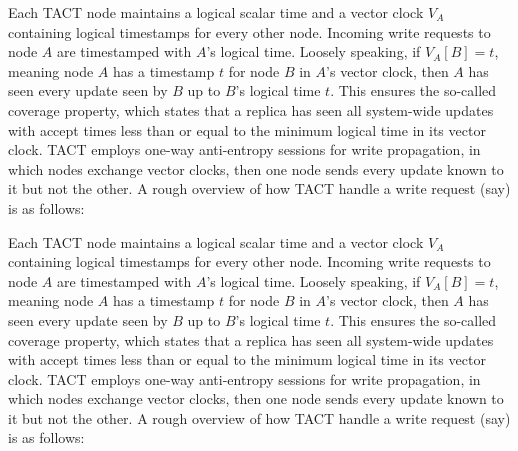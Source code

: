 Each TACT node maintains a logical scalar time and a vector clock $V_A$
containing logical timestamps for every other node. Incoming write requests to
node $A$ are timestamped with $A$'s logical time. Loosely speaking, if
$V_A[B]=t$, meaning node $A$ has a timestamp $t$ for node $B$ in $A$'s vector
clock, then $A$ has seen every update seen by $B$ up to $B$'s logical time $t$.
This ensures the so-called coverage property, which states that a replica has
seen all system-wide updates with accept times less than or equal to the minimum
logical time in its vector clock. TACT employs one-way anti-entropy sessions for
write propagation, in which nodes exchange vector clocks, then one node sends
every update known to it but not the other. A rough overview of how TACT handle
a write request (say) is as follows:

Each TACT node maintains a logical scalar time and a vector clock $V_A$
containing logical timestamps for every other node. Incoming write requests to
node $A$ are timestamped with $A$'s logical time. Loosely speaking, if
$V_A[B]=t$, meaning node $A$ has a timestamp $t$ for node $B$ in $A$'s vector
clock, then $A$ has seen every update seen by $B$ up to $B$'s logical time $t$.
This ensures the so-called coverage property, which states that a replica has
seen all system-wide updates with accept times less than or equal to the minimum
logical time in its vector clock. TACT employs one-way anti-entropy sessions for
write propagation, in which nodes exchange vector clocks, then one node sends
every update known to it but not the other. A rough overview of how TACT handle
a write request (say) is as follows:
